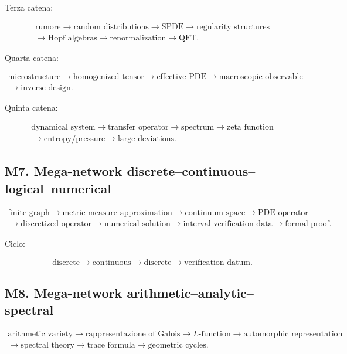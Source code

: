 \documentclass[11pt]{article}
\begin{document}
Terza catena:

\[
\begin{gathered}
\text{rumore} \to \text{random distributions} \to \text{SPDE} \to \text{regularity structures} \\
\to \text{Hopf algebras} \to \text{renormalization} \to \text{QFT}.
\end{gathered}
\]

Quarta catena:

\[
\begin{gathered}
\text{microstructure} \to \text{homogenized tensor} \to \text{effective PDE} \to \text{macroscopic observable} \\
\to \text{inverse design}.
\end{gathered}
\]

Quinta catena:

\[
\begin{gathered}
\text{dynamical system} \to \text{transfer operator} \to \text{spectrum} \to \text{zeta function} \\
\to \text{entropy/pressure} \to \text{large deviations}.
\end{gathered}
\]



\subsection{M7. Mega-network discrete--continuous--logical--numerical}

\[
\begin{gathered}
\text{finite graph} \to \text{metric measure approximation} \to \text{continuum space} \to \text{PDE operator} \\
\to \text{discretized operator} \to \text{numerical solution} \to \text{interval verification data} \to \text{formal proof}.
\end{gathered}
\]

Ciclo:

\[
\begin{gathered}
\text{discrete} \to \text{continuous} \to \text{discrete} \to \text{verification datum}.
\end{gathered}
\]



\subsection{M8. Mega-network arithmetic--analytic--spectral}

\[
\begin{gathered}
\text{arithmetic variety} \to \text{rappresentazione of Galois} \to L\text{-function} \to \text{automorphic representation} \\
\to \text{spectral theory} \to \text{trace formula} \to \text{geometric cycles}.
\end{gathered}
\]
\end{document}
